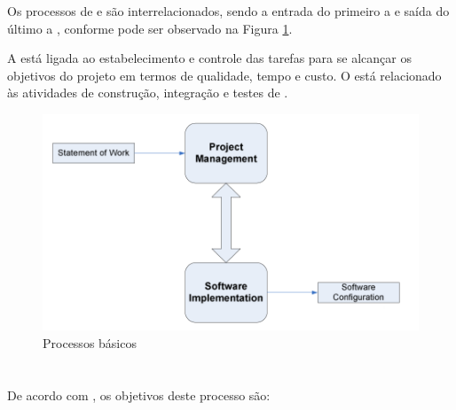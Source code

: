 Os processos de \gp e \dsw são interrelacionados, sendo a entrada do primeiro a \dt e saída do último a \swcfg, conforme pode ser observado na Figura \ref{fig:gp:dsw}. 

A \gp está ligada ao estabelecimento e controle das tarefas para se alcançar os objetivos do projeto em termos de qualidade, tempo e custo. O \dsw está relacionado às atividades de construção, integração e testes de \sw.

\begin{figure}[!h]
\centering
\includegraphics[scale=0.3]{figuras/gp_desenv_sw.png}
\caption{Processos básicos \cite[pág. 12]{iso}}
\label{fig:gp:dsw}
\end{figure}

\section{\gp}

De acordo com \cite{iso}, os objetivos deste processo são:

